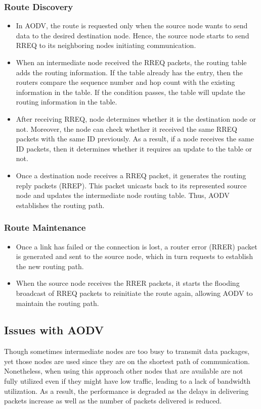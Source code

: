 \documentclass[12pt, a4paper]{article}
\begin{document}
    \subsubsection{Route Discovery}
    \begin{itemize}
        \item In AODV, the route is requested only when the source node
        wants to send data to the desired destination node. Hence, the
        source node starts to send RREQ to its neighboring nodes
        initiating communication.
        \item When an intermediate node received the RREQ packets, the
        routing table adds the routing information. If the table already
        has the entry, then the routers compare the sequence number
        and hop count with the existing information in the table. If the
        condition passes, the table will update the routing information
        in the table.
        \item After receiving RREQ, node determines whether it is the destination node or not. Moreover, the node can check whether it received the same RREQ packets with the same ID previously. As a result, if a node receives the same ID packets, then it determines whether it requires an update to the table or not.
        \item Once a destination node receives a RREQ packet, it
        generates the routing reply packets (RREP). This packet
        unicasts back to its represented source node and updates the
        intermediate node routing table. Thus, AODV establishes the
        routing path.
    \end{itemize}
    \subsubsection{Route Maintenance}
    \begin{itemize}
        \item Once a link has failed or the connection is lost, a router
        error (RRER) packet is generated and sent to the source node,
        which in turn requests to establish the new routing path.
        \item When the source node receives the RRER packets, it starts the flooding broadcast of RREQ packets to reinitiate the route
        again, allowing AODV to maintain the routing path.
    \end{itemize}
\subsection{Issues with AODV}
Though sometimes intermediate nodes are too busy to transmit data
packages, yet those nodes are used since they are on the shortest
path of communication. Nonetheless, when using this approach
other nodes that are available are not fully utilized even if they
might have low traffic, leading to a lack of bandwidth
utilization. As a result, the performance is degraded as the
delays in delivering packets increase as well as the number of
packets delivered is reduced.
\end{document}
